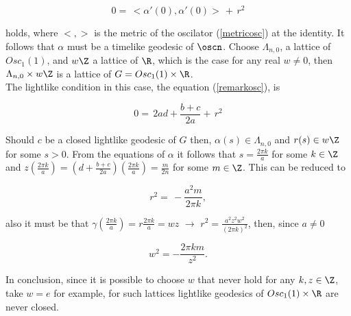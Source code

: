 \documentclass[11pt]{amsart}
\theoremstyle{plain}
\theoremstyle{definition}
\theoremstyle{remark}
\begin{document}
\begin{equation}\label{remarkosc}
0 = \, <\alpha'(0),\alpha'(0)> \, + \, r^2 
\end{equation}

holds, where $<,>$ is the metric of the oscilator (\ref{metricosc}) at the identity. It follows that $\alpha$ must be a timelike geodesic of $\oscn$. Choose $\Lambda_{n,0}$, a lattice of $Osc_1(1)$, and $w \Z$ a lattice of $\R$, which is the case for any real $w \neq 0$, then $\Lambda_{n,0} \times w \Z$ is a lattice of $G=Osc_1(1) \times \R$. \\

The lightlike condition in this case, the equation (\ref{remarkosc}), is 

\begin{equation*}
0 = \, 2 a d + \frac{b+c}{2a} + \, r^2 
\end{equation*}

Should $c$ be a closed lightlike geodesic of $G$ then, $\alpha(s) \in \Lambda_{n,0}$ and $r(s) \in w \Z$ for some $s>0$. From the equations of $\alpha$ it follows that $s=\frac{2 \pi k}{a}$ for some $k \in \Z$ and $z(\frac{2 \pi k}{a})=(d+\frac{b+c}{2 a})(\frac{2 \pi k}{a})=\frac{m}{2n}$ for some $m \in \Z$. This can be reduced to 

\begin{equation*}
r^2 = \, - \frac{a^2 m}{2 \pi k},
\end{equation*}

also it must be that $\gamma(\frac{2 \pi k}{a}) = r \frac{2 \pi k}{a} = w z$ $\rightarrow$ $r^2 = \frac{a^2 z^2 w^2}{(2 \pi k)^2}$, then, since $a \neq 0$

\begin{equation*}
w^2 = -\frac{2 \pi k m}{z^2}.
\end{equation*}

In conclusion, since it is possible to choose $w$ that never hold for any $k,z \in \Z$, take $w = e$ for example, for such lattices lightlike geodesics of $Osc_1(1) \times \R$ are never closed. 





% 
% 
% 
% 
%
\end{document}
